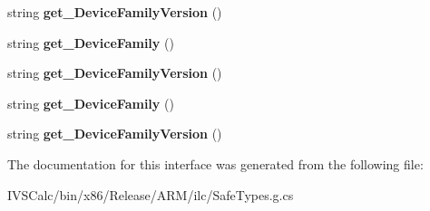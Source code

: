 \begin{DoxyCompactItemize}
string {\bfseries get\+\_\+\+Device\+Family\+Version} ()
\item 
\mbox{\label{interface_windows_1_1_system_1_1_profile_1_1_i_analytics_version_info_a123981ecd7ac09b4fa3f11b37ec6f741}} 
string {\bfseries get\+\_\+\+Device\+Family} ()
\item 
\mbox{\label{interface_windows_1_1_system_1_1_profile_1_1_i_analytics_version_info_a5a1fbf289b9852814166002dcee9a749}} 
string {\bfseries get\+\_\+\+Device\+Family\+Version} ()
\item 
\mbox{\label{interface_windows_1_1_system_1_1_profile_1_1_i_analytics_version_info_a123981ecd7ac09b4fa3f11b37ec6f741}} 
string {\bfseries get\+\_\+\+Device\+Family} ()
\item 
\mbox{\label{interface_windows_1_1_system_1_1_profile_1_1_i_analytics_version_info_a5a1fbf289b9852814166002dcee9a749}} 
string {\bfseries get\+\_\+\+Device\+Family\+Version} ()
\end{DoxyCompactItemize}


The documentation for this interface was generated from the following file\+:\begin{DoxyCompactItemize}
\item 
I\+V\+S\+Calc/bin/x86/\+Release/\+A\+R\+M/ilc/Safe\+Types.\+g.\+cs\end{DoxyCompactItemize}
